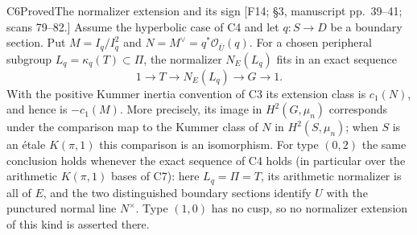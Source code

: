 \begin{result}{C6}{Proved}{The normalizer extension and its sign}
\textup{[F14; \S3, manuscript pp.\ 39--41; scans 79--82.]}
Assume the hyperbolic case of C4 and let $q:S\to D$ be a boundary
section. Put $M=I_q/I_q^2$ and $N=M^\vee=q^*\mathcal O_{\bar U}(q)$.
For a chosen peripheral subgroup $L_q=\kappa_q(T)\subset\Pi$, the
normalizer $N_E(L_q)$ fits in an exact sequence
\[
 1\longrightarrow T\longrightarrow N_E(L_q)
       \longrightarrow G\longrightarrow1.                 \tag{C.5}
\]
With the positive Kummer inertia convention of C3 its extension class
is $c_1(N)$, and hence is $-c_1(M)$. More precisely, its image in
$H^2(G,\mu_n)$ corresponds under the comparison map to the Kummer
class of $N$ in $H^2(S,\mu_n)$; when $S$ is an \'etale $K(\pi,1)$ this
comparison is an isomorphism.
For type $(0,2)$ the same conclusion holds whenever the exact
sequence of C4 holds (in particular over the arithmetic $K(\pi,1)$
bases of C7): here $L_q=\Pi=T$, its arithmetic normalizer is all of
$E$, and the two distinguished boundary sections identify $U$
with the punctured normal line $N^\times$. Type $(1,0)$ has no cusp,
so no normalizer extension of this kind is asserted there.
\end{result}

